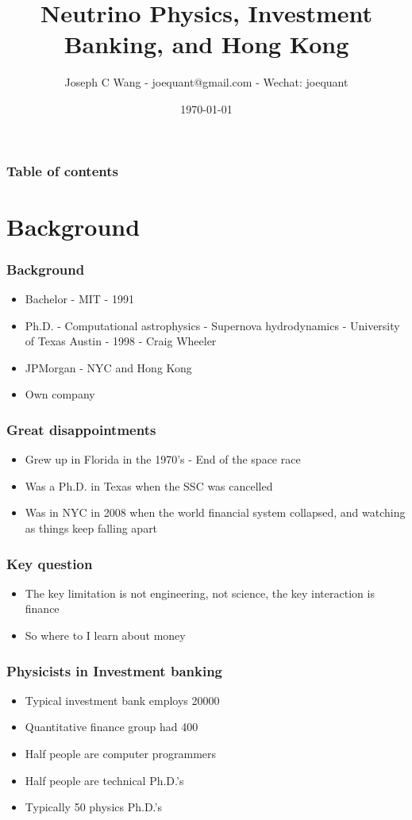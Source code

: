 \documentclass{beamer}
\begin{document}
\title{Neutrino Physics, Investment Banking, and Hong Kong}
\author{Joseph C Wang - joequant@gmail.com - Wechat: joequant}
\date{\today}

\begin{frame}
  \titlepage
\end{frame}

\begin{frame}\frametitle{Table of contents}\tableofcontents
\end{frame}

\section{Background}
\begin{frame}\frametitle{Background}
  \begin{itemize}
  \item Bachelor - MIT - 1991
  \item Ph.D. - Computational astrophysics - Supernova hydrodynamics
    - University of Texas Austin - 1998 - Craig Wheeler
  \item JPMorgan - NYC and Hong Kong
  \item Own company
  \end{itemize}
\end{frame}

\begin{frame}\frametitle{Great disappointments}
  \begin{itemize}
  \item Grew up in Florida in the 1970's - End of the space race
  \item Was a Ph.D. in Texas when the SSC was cancelled
  \item Was in NYC in 2008 when the world financial system collapsed,
    and watching as things keep falling apart
  \end{itemize}
\end{frame}

\begin{frame}\frametitle{Key question}
  \begin{itemize}
    \item The key limitation is not engineering, not science, the key
      interaction is finance
    \item So where to I learn about money
  \end{itemize}
\end{frame}

\begin{frame}\frametitle{Physicists in Investment banking}
  \begin{itemize}
  \item Typical investment bank employs 20000
  \item Quantitative finance group had 400
  \item Half people are computer programmers
  \item Half people are technical Ph.D.'s
  \item Typically 50 physics Ph.D.'s
  \end{itemize}
\end{frame}
\end{document}
